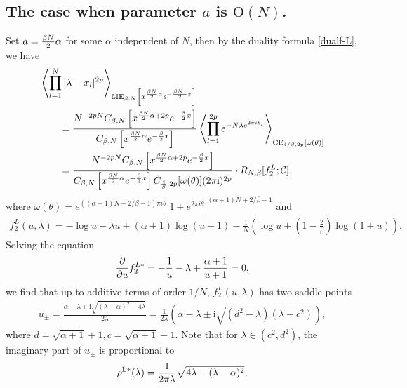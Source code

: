 \documentclass[11pt,a4paper]{article}
\numberwithin{equation}{section} %
\theoremstyle{plain}
\theoremstyle{definition}
\numberwithin{prop}{section}
\numberwithin{cor}{section}
\numberwithin{remark}{section}
\begin{document}
\subsection{The case when parameter $a$ is  $\mathrm{O}(N)$.}\label{S4.2}
Set $a={\beta N\over2}\alpha$ for some $\alpha$ independent of $N$, then by the duality formula \eqref{dualf-L}, we have
\begin{align}
    &\left\langle\prod_{l=1}^N |\lambda-x_l|^{2 p}\right\rangle_{\mathrm{ME}_{\beta, N}\left[x^{{\beta N\over2}\alpha}e^{-{\beta N\
    \over 2} x}\right]}\nonumber \\
    &\qquad =\frac{N^{-2pN}  C_{\beta, N}\left[x^{{\beta N\over2}\alpha+2 p} e^{-\frac{\beta}{2} x}\right]}{C_{\beta, N}\left[x^{{\beta N\over2}\alpha} e^{-\frac{\beta}{2} x}\right]}\left\langle\prod_{l=1}^{2p} e^{-N\lambda e^{2 \pi i \theta_l}}\right\rangle_{\mathrm{CE}_{4 / \beta, 2p}\left[\omega(\theta)\right]}\nonumber \\
    &\qquad=\frac{N^{-2pN}  C_{\beta, N}\left[x^{{\beta N\over2}\alpha+2 p} e^{-\frac{\beta}{2} x}\right]}{C_{\beta, N}\left[x^{{\beta N\over2}\alpha} e^{-\frac{\beta}{2} x}\right]\tilde{C}_{{4\over\beta},2p}[\omega(\theta)](2\pi\mathrm{i})^{2p}}\cdot R_{N,\beta}[f^{L}_2;\mathcal{C}], \label{eq-RN-L2}
\end{align}
where $\omega(\theta)=e^{((\alpha -1)N+2 /\beta-1)\pi i \theta}\left|1+e^{2 \pi i \theta}\right|^{(\alpha+1)N+2 / \beta-1}$ and
\begin{align*}
    f^L_2(u,\lambda)=-\log u-\lambda u+(\alpha+1)\log(u+1)-\frac{1}{N}\left(\log u+\left(1-\frac{2}{\beta}\right)\log(1+u)\right).
\end{align*}
Solving the equation 
\begin{align*}
    {\partial \over \partial u}f^{L*}_2 =-\frac{1}{u}-\lambda+\frac{\alpha+1}{u+1}=0,
\end{align*}
we find that up to additive terms of order $1/N$, $f_2^L(u,\lambda)$ has two saddle points
\begin{align*}
    u_{ \pm}=\frac{\alpha-\lambda \pm \mathrm{i}\sqrt{(\lambda-\alpha)^2-4 \lambda}}{2 \lambda}=\frac{1}{2 \lambda}\left(\alpha-\lambda \pm \mathrm{i} \sqrt{\left(d^2-\lambda\right)\left(\lambda-c^2\right)}\right), 
\end{align*}
where $d=\sqrt{\alpha+1}+1, c=\sqrt{\alpha+1}-1$. Note that 
for $\lambda \in (c^2,d^2)$, the imaginary part of $u_\pm$ is proportional to
\begin{align}\label{L-dens2}
        \rho^{\rm L*}(\lambda)={1\over 2\pi\lambda}\sqrt{4\lambda-(\lambda-\alpha)^2},
\end{align}
\end{document}
